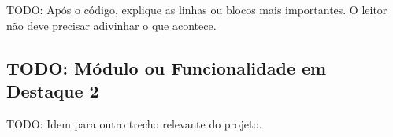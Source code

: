 TODO: Após o código, explique as linhas ou blocos mais importantes.
O leitor não deve precisar adivinhar o que acontece.


\subsection{TODO: Módulo ou Funcionalidade em Destaque 2}
\label{subsec:destaque2}

TODO: Idem para outro trecho relevante do projeto.

%
%
%




